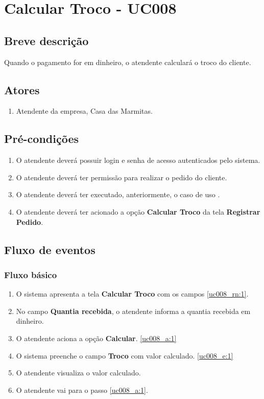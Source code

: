 \chapter{Calcular Troco - UC008} \label{uc008}

\section{Breve descrição}

Quando o pagamento for em dinheiro, o atendente calculará o troco do cliente.

\section{Atores}

\begin{enumerate}
	\item Atendente da empresa, Casa das Marmitas.
\end{enumerate}

\section{Pré-condições}

\begin{enumerate}
	\item O atendente deverá possuir login e senha de acesso autenticados pelo sistema.
	\item O atendente deverá ter permissão para realizar o pedido do cliente.
	\item O atendente deverá ter executado, anteriormente, o caso de uso .
	\item O atendente deverá ter acionado a opção \textbf{Calcular Troco} da tela \textbf{Registrar Pedido}.
\end{enumerate}

\section{Fluxo de eventos}

\subsection{Fluxo básico}

\begin{enumerate}[label=P\arabic*]
	\item O sistema apresenta a tela \textbf{Calcular Troco} com os campos \ref{uc008_rn:1}. \label{uc008_p:1}
	\item No campo \textbf{Quantia recebida}, o atendente informa a quantia recebida em dinheiro. \label{uc008_p:2}	
	\item O atendente aciona a opção \textbf{Calcular}. \label{uc008_p:3}\ref{uc008_a:1}
	\item O sistema preenche o campo \textbf{Troco} com valor calculado. \ref{uc008_e:1}
	\item O atendente visualiza o valor calculado.
	\item O atendente vai para o passo \ref{uc008_a:1}.	
\end{enumerate}

